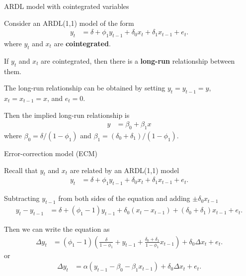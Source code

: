 \documentclass[10pt,aspectratio=169]{beamer}  %
\begin{document}

\begin{frame}{ARDL model with cointegrated variables}

    \bigskip
    Consider an ARDL(1,1) model of the form
    \begin{align*}
        y_{t} & = \delta + \phi_1 y_{t-1} + \delta_0 x_{t} + \delta_1 x_{t-1} + e_{t}.
    \end{align*}
    where $ y_{t} $ and $ x_{t} $ are \textbf{cointegrated}.

    \medskip
    If $ y_{t} $ and $ x_{t} $ are cointegrated, then there is a \textbf{long-run} relationship between them.

    \medskip
    The long-run relationship can be obtained by setting $ y_{t} = y_{t-1} = y $, $ x_{t} = x_{t-1} = x $, and $ e_{t} = 0 $.

    \medskip
    Then the implied long-run relationship is
    \begin{align*}
        y & = \beta_0 + \beta_1 x
    \end{align*}
    where $ \beta_0 = \delta / (1 - \phi_1) $ and $ \beta_1 = (\delta_0 + \delta_1) / (1 - \phi_1) $.

\end{frame}


\begin{frame}{Error-correction model (ECM)}

    \bigskip
    Recall that $ y_{t} $ and $ x_{t} $ are related by an ARDL(1,1) model
    \begin{align*}
        y_{t} & = \delta + \phi_1 y_{t-1} + \delta_0 x_{t} + \delta_1 x_{t-1} + e_{t}.
    \end{align*}

    Subtracting $ y_{t-1} $ from both sides of the equation and adding $ \pm \delta_0 x_{t-1} $
    \begin{align*}
        y_{t} - y_{t-1} & = \delta + (\phi_1 - 1) y_{t-1} + \delta_0 \left( x_{t} - x_{t-1} \right) + \left( \delta_0 + \delta_1 \right) x_{t-1} + e_{t}.
    \end{align*}

    Then we can write the equation as
    \begin{align*}
        \Delta y_{t} & = \left( \phi_1 - 1 \right) \left( \frac{\delta}{1 - \phi_1} + y_{t-1} + \frac{\delta_0 + \delta_1}{1 - \phi_1} x_{t-1} \right) + \delta_0 \Delta x_{t} + e_{t}.
    \end{align*}
    or
    \begin{align*}
        \Delta y_{t} & = \alpha \left( y_{t-1} - \beta_0 - \beta_1 x_{t-1} \right) + \delta_0 \Delta x_{t} + e_{t}.
    \end{align*}

\end{frame}
\end{document}
